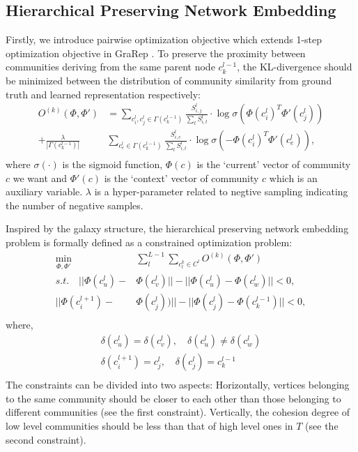 \documentclass{article}
\theoremstyle{definition}
\begin{document}
	 \subsection{Hierarchical Preserving Network Embedding}
	 Firstly, we introduce pairwise optimization objective which extends 1-step optimization objective in GraRep \cite{Cao2015GraRep}. To preserve the proximity between communities deriving from the same parent node $c_k^{l-1}$, the KL-divergence should be minimized between the distribution of community similarity from ground truth and learned representation respectively: 
			\begin{equation}
			\label{equ:local_loss} 
			\begin{split}
			O^{(k)}(\Phi, \Phi') & = \sum_{c_i^l, c_j^l \in \Gamma(c_k^{l-1})} \frac{S_{i,j}^l}{\sum_t S_{i, t}^l} \cdot \log{\sigma(\Phi(c_i^l)^T \Phi'(c_j^l))} \\
			+ \frac{\lambda}{|\Gamma(c_k^{l-1})|}&\sum_{c_e^l \in \Gamma(c_k^{l-1})} \frac{S_{i, e}^l}{\sum_t S_{i, t}^l} \cdot \log{\sigma(-\Phi(c_i^l)^T \Phi'(c_e^l))}, \\
			\end{split}
			\end{equation}
	where $\sigma(\cdot)$ is the sigmoid function, $\Phi(c)$ is the `current' vector of community $c$ we want and $\Phi'(c)$ is the `context' vector of community $c$ which is an auxiliary variable. $\lambda$ is a hyper-parameter related to negtive sampling indicating the number of negative samples.

	Inspired by the galaxy structure, the hierarchical preserving network embedding problem is formally defined as a constrained optimization problem:
			\begin{equation}
			\label{equ:whole_loss}
			\begin{split}
			\min_{\Phi,\Phi'} & \sum_l^{L-1}\sum_{c^k_l \in C^l} O^{(k)}(\Phi, \Phi') \\
			s.t. \quad
			|| \Phi(c_u^l) - & \Phi(c_v^l) || - ||\Phi(c_u^l) - \Phi(c_w^l)|| < 0, \\
			|| \Phi(c_i^{l+1}) - & \Phi(c_j^{l})) || - ||\Phi(c_j^{l}) - \Phi(c_k^{l - 1})|| < 0,\\
			\end{split}
			\end{equation}
			where,
			\[
			\begin{split}
				\delta(c_u^l) = \delta(c_v^l), \quad \delta(c_u^l) \neq \delta(c_w^l)\\
				\delta(c_i^{l+1}) = c^l_j, \quad \delta(c^l_j) = c^{l - 1}_k \\ 
			\end{split}
			\]
		The constraints can be divided into two aspects: Horizontally, vertices belonging to the same community should be closer to each other than those belonging to different communities (see the first constraint). 
		Vertically, the cohesion degree of low level communities should be less than that of high level ones in $T$ (see the second constraint). 
	
\end{document}
